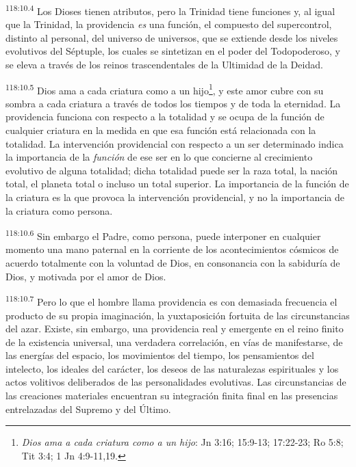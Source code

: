 \par
\textsuperscript{118:10.4} Los Dioses tienen atributos, pero la Trinidad tiene funciones y, al igual que la Trinidad, la providencia \textit{es} una función, el compuesto del supercontrol, distinto al personal, del universo de universos, que se extiende desde los niveles evolutivos del Séptuple, los cuales se sintetizan en el poder del Todopoderoso, y se eleva a través de los reinos trascendentales de la Ultimidad de la Deidad.

\par
\textsuperscript{118:10.5} Dios ama a cada criatura como a un hijo\footnote{\textit{Dios ama a cada criatura como a un hijo}: Jn 3:16; 15:9-13; 17:22-23; Ro 5:8; Tit 3:4; 1 Jn 4:9-11,19.}, y este amor cubre con su sombra a cada criatura a través de todos los tiempos y de toda la eternidad. La providencia funciona con respecto a la totalidad y se ocupa de la función de cualquier criatura en la medida en que esa función está relacionada con la totalidad. La intervención providencial con respecto a un ser determinado indica la importancia de la \textit{función} de ese ser en lo que concierne al crecimiento evolutivo de alguna totalidad; dicha totalidad puede ser la raza total, la nación total, el planeta total o incluso un total superior. La importancia de la función de la criatura es la que provoca la intervención providencial, y no la importancia de la criatura como persona.

\par
\textsuperscript{118:10.6} Sin embargo el Padre, como persona, puede interponer en cualquier momento una mano paternal en la corriente de los acontecimientos cósmicos de acuerdo totalmente con la voluntad de Dios, en consonancia con la sabiduría de Dios, y motivada por el amor de Dios.

\par
\textsuperscript{118:10.7} Pero lo que el hombre llama providencia es con demasiada frecuencia el producto de su propia imaginación, la yuxtaposición fortuita de las circunstancias del azar. Existe, sin embargo, una providencia real y emergente en el reino finito de la existencia universal, una verdadera correlación, en vías de manifestarse, de las energías del espacio, los movimientos del tiempo, los pensamientos del intelecto, los ideales del carácter, los deseos de las naturalezas espirituales y los actos volitivos deliberados de las personalidades evolutivas. Las circunstancias de las creaciones materiales encuentran su integración finita final en las presencias entrelazadas del Supremo y del Último.


